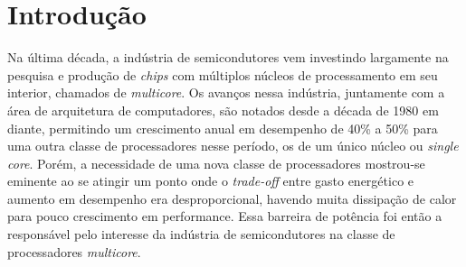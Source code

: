 
\newcommand{\multicore}{\textit{multicore}\xspace}
\newcommand{\chip}{\textit{chip}\xspace}
\newcommand{\chips}{\textit{chips}\xspace}
\newcommand{\singlecore}{\textit{single core}\xspace}
\newcommand{\tradeoff}{\textit{trade-off}\xspace}
\newcommand{\exascale}{\textit{Exascale}\xspace}
\newcommand{\greencomputing}{\textit{Green Computing}\xspace}  
\newcommand{\ranking}{\textit{ranking}\xspace}
\newcommand{\bench}{\textit{benchmark}\xspace}
\newcommand{\benchs}{\textit{benchmarks}\xspace}
\newcommand{\capb}{CAP Bench\xspace}
\newcommand{\etal}{\textit{et al}.\xspace}
\newcommand{\thread}{\textit{thread}\xspace}
\newcommand{\threads}{\textit{threads}\xspace}
\newcommand{\cache}{\textit{cache}\xspace}
\newcommand{\caches}{\textit{caches}\xspace}
\newcommand{\byte}{\textit{byte}\xspace}
\newcommand{\bytes}{\textit{bytes}\xspace}
\newcommand{\hardware}{\textit{hardware}\xspace}
\newcommand{\transistor}{\textit{transistor}\xspace}
\newcommand{\transistors}{\textit{transistors}\xspace}
\newcommand{\manycore}{\textit{manycore}\xspace}
\newcommand{\hardware}{\textit{hardware}\xspace}
\newcommand{\mppa}{MPPA-256\xspace}
\newcommand{\cluster}{\textit{cluster}\xspace}
\newcommand{\clusters}{\textit{clusters}\xspace}
\newcommand{\kernel}{\textit{kernel}\xspace}
\newcommand{\kernels}{\textit{kernels}\xspace}
\newcommand{\offset}{\textit{offset}\xspace}
\newcommand{\offsets}{\textit{offsets}\xspace}

\chapter{Introdução}
\label{ch:introdução}

Na última década, a indústria de semicondutores vem investindo largamente na pesquisa e produção de \chips com múltiplos núcleos de processamento em seu interior, chamados de \multicore. Os avanços nessa indústria, juntamente com a área de arquitetura de computadores, são notados desde a década de 1980 em diante, permitindo um crescimento anual em desempenho de 40\% a 50\% \cite{Larus2008} para uma outra classe de processadores nesse período, os de um único núcleo ou \singlecore. Porém, a necessidade de uma nova classe de processadores mostrou-se eminente ao se atingir um ponto onde o \tradeoff entre gasto energético e aumento em desempenho era desproporcional, havendo muita dissipação de calor para pouco crescimento em performance. Essa barreira de potência foi então a responsável pelo interesse da indústria de semicondutores na classe de processadores \multicore. 


